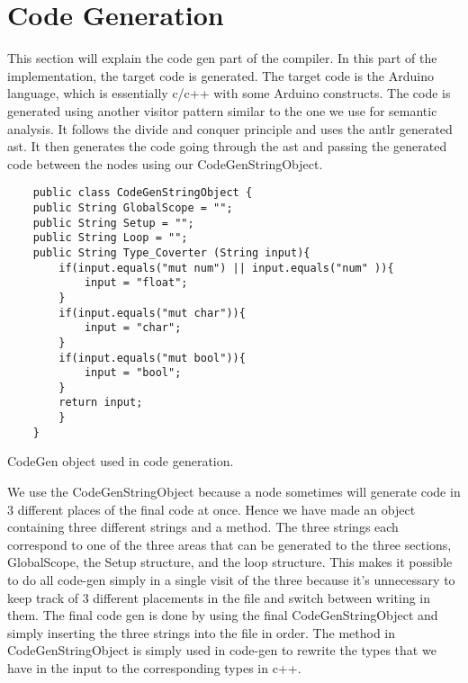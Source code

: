 \section{Code Generation}\label{sec:codegeneration}
This section will explain the code gen part of the compiler. In this part of the implementation, the target
code is generated. The target code is the Arduino language, which is essentially c/c++ with some Arduino constructs. The code is generated using another visitor pattern similar to the one we use for semantic analysis. It follows the divide and conquer principle and uses the antlr generated \gls{ast}. It then generates the code going through the \gls{ast} and passing the generated code between the nodes using our CodeGenStringObject.

\begin{listing}[htb!]
    \begin{verbatim}
    public class CodeGenStringObject {
    public String GlobalScope = "";
    public String Setup = "";
    public String Loop = "";
    public String Type_Coverter (String input){
        if(input.equals("mut num") || input.equals("num" )){
            input = "float";
        }
        if(input.equals("mut char")){
            input = "char";
        }
        if(input.equals("mut bool")){
            input = "bool";
        }
        return input;
        }
    }
    \end{verbatim}
    \caption{CodeGen object used in code generation.}
    \label{lst:code gen object}
\end{listing}

We use the CodeGenStringObject because a node sometimes will generate code in 3 different places of the final code at once. Hence we have made an object containing three different strings and a method. The three strings each correspond to one of the three areas that can be generated to the three sections, GlobalScope, the Setup structure, and the loop structure. This makes it possible to do all code-gen simply in a single visit of the three because it's unnecessary to keep track of 3 different placements in the file and switch between writing in them. The final code gen is done by using the final CodeGenStringObject and simply inserting the three strings into the file in order.  The method in CodeGenStringObject is simply used in code-gen to rewrite the types that we have in the input to the corresponding types in c++.

